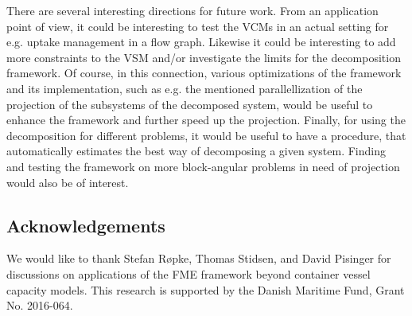\documentclass{llncs}
\begin{document}
There are several interesting directions for future work. 
From an application point of view, it could be interesting to test the VCMs in an actual setting for e.g. uptake management in a flow graph.
Likewise it could be interesting to  add more constraints to the VSM and/or investigate the limits for the decomposition framework. Of course, in this connection, various optimizations of the framework and its implementation, such as e.g. the mentioned parallellization of the projection of the subsystems of the decomposed system, would be useful to enhance the framework and further speed up the projection. Finally, for using the decomposition for different problems, it would be useful to have a procedure, that automatically estimates the best way of decomposing a given system. Finding and testing the framework on more block-angular problems in need of projection would also be of interest.

\subsection*{Acknowledgements}
We would like to thank Stefan R{\o}pke, Thomas Stidsen, and David Pisinger for discussions on applications of the FME framework beyond container vessel capacity models. This research is supported by the Danish Maritime Fund, Grant No. 2016-064.



\end{document}
